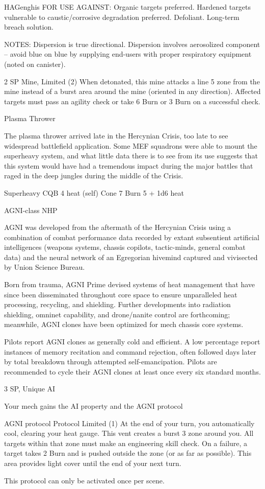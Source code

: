 \begin{mech}{HA}{Genghis}
FOR USE AGAINST: Organic targets preferred. Hardened targets vulnerable to caustic/corrosive degradation preferred. Defoliant. Long-term breach solution.

NOTES: Dispersion is true directional. Dispersion involves aerosolized component -- avoid blue on blue by supplying end-users with proper respiratory equipment (noted on canister).

2 SP
Mine, Limited (2)
When detonated, this mine attacks a line 5 zone from the mine instead of a burst area around the mine (oriented in any direction). Affected targets must pass an agility check or take 6 Burn or 3 Burn on a successful check.


Plasma Thrower

The plasma thrower arrived late in the Hercynian Crisis, too late to see widespread battlefield application. Some MEF squadrons were able to mount the superheavy system, and what little data there is to see from its use suggests that this system would have had a tremendous impact during the major battles that raged in the deep jungles during the middle of the Crisis.

Superheavy CQB
4 heat (self)
Cone 7
Burn 5 + 1d6 heat


AGNI-class NHP

AGNI was developed from the aftermath of the Hercynian Crisis using a combination of combat performance data recorded by extant subsentient artificial intelligences (weapons systems, chassis copilots, tactic-minds, general combat data) and the neural network of an Egregorian hivemind captured and vivisected by Union Science Bureau.

Born from trauma, AGNI Prime devised systems of heat management that have since been disseminated throughout core space to ensure unparalleled heat processing, recycling, and shielding. Further developments into radiation shielding, omninet capability, and drone/nanite control are forthcoming; meanwhile, AGNI clones have been optimized for mech chassis core systems.

Pilots report AGNI clones as generally cold and efficient. A low percentage report instances of memory recitation and command rejection, often followed days later by total breakdown through attempted self-emancipation. Pilots are recommended to cycle their AGNI clones at least once every six standard months.

3 SP, Unique
AI

Your mech gains the AI property and the AGNI protocol

         AGNI protocol
	     Protocol
         Limited (1)
         At the end of your turn, you automatically cool, clearing your heat gauge. This vent creates a burst 3 zone around you. All targets within that zone must make an engineering skill check. On a failure, a target takes 2 Burn and is pushed outside the zone (or as far as possible). This area provides light cover until the end of your next turn.

         This protocol can only be activated once per scene.
\end{mech}
